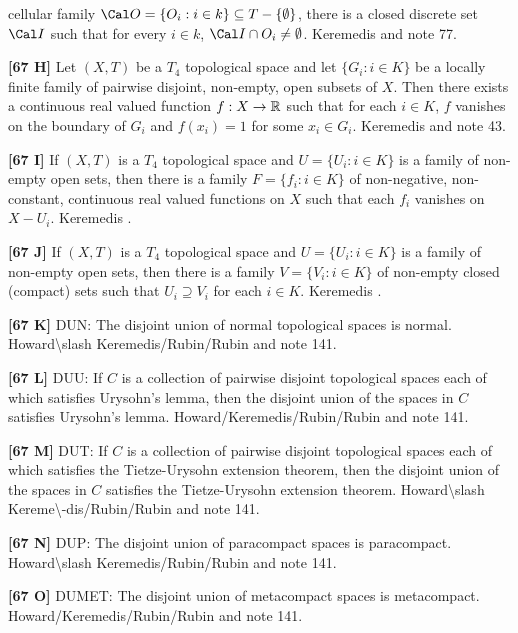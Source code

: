 cellular family $\Cal O=\{O_i: i\in k\}\subseteq T - \{\emptyset\}$,
there is a closed discrete set $\Cal I$ such that for every $i\in k$,
$\Cal I\cap O_i\ne\emptyset$. \ac{Keremedis} \cite{1998a} and note 77.
\smallskip
\item{}{\bf [67 H]} Let $(X, T)$ be a $T_4$ topological space and let
$\{G_i: i\in K\}$ be a locally finite family of pairwise disjoint,
non-empty, open subsets of $X$. Then there exists a continuous real
valued function $f: X\to \Bbb R$ such that for each $i\in K$, $f$ vanishes
on the boundary of $G_i$ and $f(x_i) = 1$ for some $x_i\in G_i$.
\ac{Keremedis} \cite{1997} and note 43.
\smallskip
\item{}{\bf [67 I]} If $(X,T)$ is a $T_4$ topological space and $U =
\{U_i: i\in K\}$ is a family of non-empty open sets, then there is a
family $F = \{f_i: i\in K\}$ of non-negative, non-constant,
continuous real valued functions on $X$ such that each $f_i$
vanishes on $X - U_i$. \ac{Keremedis} \cite{1997}.
\smallskip
\item{}{\bf [67 J]} If $(X,T)$ is a $T_4$ topological space and $U =
\{U_i: i\in K\}$ is a family of non-empty open sets, then there is a
family $V = \{V_i: i\in K\}$ of non-empty closed (compact) sets such
that $U_i \supseteq V_i$ for each $i\in K$.  \ac{Keremedis} \cite{1997}.
\smallskip
\item{}{\bf [67 K]} DUN: The disjoint union of normal topological
spaces is normal. \ac{Howard\slash Keremedis/Rubin/Rubin} \cite{1998a} and
note 141.
\smallskip
\item{}{\bf [67 L]} DUU: If $C$ is a collection of pairwise
disjoint topological spaces each of which satisfies Urysohn's
lemma, then the disjoint union of the spaces in $C$ satisfies
Urysohn's lemma.  \ac{Howard/Keremedis/Rubin/Rubin} \cite{1998a}
and note 141.
\smallskip
\item{}{\bf [67 M]} DUT:  If $C$ is a collection of pairwise
disjoint topological spaces each of which satisfies the Tietze-Urysohn
extension theorem, then the disjoint union of the spaces in $C$
satisfies the Tietze-Urysohn extension theorem.
\ac{Howard\slash Kereme\-dis/Rubin/Rubin} \cite{1998a} and note 141.
\smallskip
\item{}{\bf [67 N]} DUP: The disjoint union of paracompact spaces is
paracompact. \ac{Howard\slash Keremedis/Rubin/Rubin} \cite{1998b} and
note 141.
\smallskip
\item{}{\bf [67 O]} DUMET: The disjoint union of metacompact spaces is
metacompact. \ac{Howard/Keremedis/Rubin/Rubin} \cite{1998b} and note 141.
